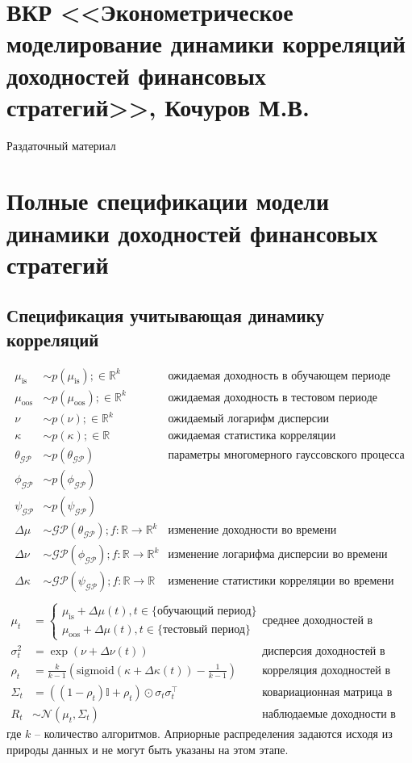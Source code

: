 \documentclass{article}
\newcommand{\Real}{\mathbb{R}}
\begin{document}
\section*{ВКР <<Эконометрическое моделирование динамики корреляций доходностей финансовых стратегий>>, Кочуров М.В. }
{\large \centering Раздаточный материал}
\section{Полные спецификации модели динамики доходностей финансовых стратегий}
\subsection{Спецификация учитывающая динамику корреляций}
\begin{align}
\mu_\text{is} &\sim p(\mu_\text{is}); \in \Real^k& \text{ожидаемая доходность в обучающем периоде}\\
\mu_\text{oos} &\sim p(\mu_\text{oos});\in \Real^k&\text{ожидаемая доходность в тестовом периоде}\\
\nu &\sim p(\nu);\in \Real^k&\text{ожидаемый логарифм дисперсии}\\
\kappa &\sim p(\kappa);\in \Real& \text{ожидаемая статистика корреляции}\\
\theta_\mathcal{GP} &\sim p(\theta_\mathcal{GP})&\text{параметры многомерного гауссовского процесса}\\
\phi_\mathcal{GP} &\sim p(\phi_\mathcal{GP})&\\
\psi_\mathcal{GP} &\sim p(\psi_\mathcal{GP})&\\
\Delta\mu &\sim \mathcal{GP}(\theta_\mathcal{GP}); f:\Real \to \Real^k&\text{изменение доходности во времени}\\
\Delta\nu &\sim \mathcal{GP}(\phi_\mathcal{GP}); f:\Real \to \Real^k&\text{изменение логарифма дисперсии во времени}\\
\Delta\kappa &\sim \mathcal{GP}(\psi_\mathcal{GP}); f:\Real \to \Real&\text{изменение статистики корреляции во времени}\\
\end{align}
\begin{align}
\mu_t &= \begin{cases}
\mu_\text{is} + \Delta\mu(t), t \in \text{\{обучающий период\}}\\
\mu_\text{oos} + \Delta\mu(t), t \in \text{\{тестовый период\}}
\end{cases}&\text{среднее доходностей в момент t}\\
\sigma^2_t &= \exp(\nu + \Delta\nu(t))& \text{дисперсия доходностей в момент t}\\
\rho_t &= \tfrac{k}{k-1}(\text{sigmoid}(\kappa + \Delta\kappa(t))-\tfrac{1}{k-1})&\text{корреляция доходностей в момент t}\\
\Sigma_t &= ((1-\rho_t)\mathbb{I} + \rho_t) \odot \sigma_t\sigma_t^\top&\text{ковариационная матрица в момент t}\\
R_t &\sim \mathcal{N}(\mu_t,\Sigma_t)& \text{наблюдаемые доходности в момент t}\label{eq:dyncorr}
\end{align}
где $k$ -- количество алгоритмов. Априорные распределения задаются исходя из природы данных и не могут быть указаны на этом этапе.
\end{document}
